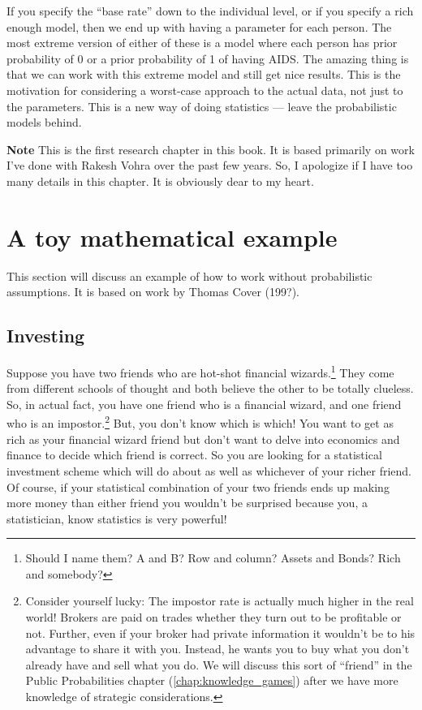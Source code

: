 \documentclass{book}
\begin{document}
If you specify the ``base rate'' down to the individual level, or if
you specify a rich enough model, then we end up with having a
parameter for each person.  The most extreme version of either of
these is a model where each person has prior probability of 0 or a
prior probability of 1 of having AIDS.  The amazing thing is that we
can work with this extreme model and still get nice results.  This
is the motivation for considering a worst-case approach to the actual
data, not just to the parameters.  This is a new way of doing
statistics --- leave the probabilistic models behind.  

{\bf Note} This is the first research chapter in this book.  It is
based primarily on work I've done with Rakesh Vohra over the past few
years.  So, I apologize if I have too many details in this chapter.
It is obviously dear to my heart. 

    \section[example]{A toy mathematical example}

%
This section will discuss an example of how to work without
probabilistic assumptions.  It is based on work by Thomas Cover
(199?).
 
        \subsection{Investing}

%


Suppose you have two friends who are hot-shot financial
wizards.\footnote{Should I name them? A and B? Row and column? Assets
and Bonds?  Rich and somebody?}  They
come from different schools of thought and both believe the other to
be totally clueless.  So, in actual fact, you have one friend who is a
financial wizard, and one friend who is an impostor.\footnote{Consider
  yourself lucky: The impostor rate is actually much higher in the real
  world!  Brokers are paid on trades whether they turn out to be
  profitable or not.  Further, even if your broker had private
  information it wouldn't be to his advantage to share it with you.
  Instead, he wants you to buy what you don't already have and sell
  what you do.  We will discuss this sort of ``friend'' in the
  Public Probabilities chapter (\ref{chap:knowledge_games}) after we have
  more knowledge of strategic considerations. } But, you don't know
which is which!  You want to get as rich as your financial wizard
friend but don't want to delve into economics and finance to decide
which friend is correct.  So you are looking for a statistical
investment scheme which will do about as well as whichever of your
richer friend.  Of course, if your statistical combination of your
two friends ends up making more money than either friend you wouldn't
be surprised because you, a statistician, know statistics is very
powerful!
\end{document}
